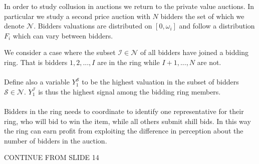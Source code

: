 In order to study collusion in auctions we return to the private value auctions. In particular we study a second price auction with $N$ bidders the set of which we denote $\mathcal{N}$. Bidders valuations are distributed on $[0,\omega_i]$ and follow a distribution $F_i$ which can vary between bidders.

We consider a case where the subset $\mathcal{I} \in \mathcal{N}$ of all bidders have joined a bidding ring. That is bidders $1,2,...,I$ are in the ring while $I+1,...,N$ are not.
\\ \\
Define also a variable $Y_1^{\mathcal{S}}$ to be the highest valuation in the subset of bidders $\mathcal{S} \in \mathcal{N}$. $Y_1^{\mathcal{I}}$ is thus the highest signal among the bidding ring members. 
\\ \\ 
Bidders in the ring needs to coordinate to identify one representative for their ring, who will bid to win the item, while all others submit shill bids. In this way the ring can earn profit from exploiting the difference in perception about the number of bidders in the auction. 

CONTINUE FROM SLIDE 14
